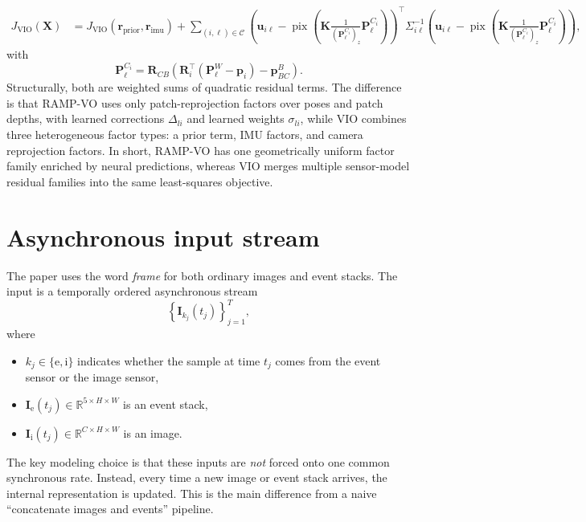 \documentclass[11pt]{article}
\newcommand{\R}{\mathbb{R}}
\newcommand{\T}{^{\top}}
\begin{document}
\begin{align}
J_{\mathrm{VIO}}(\mathbf{X}) &=
J_{\mathrm{VIO}}(\mathbf{r}_{\mathrm{prior}},\mathbf{r}_{\mathrm{imu}})
+
\sum_{(i,\ell)\in \mathcal{C}}
\left(
\mathbf{u}_{i\ell} -
\operatorname{pix}\!\left(
\mathbf{K}\frac{1}{(\mathbf{P}_{\ell}^{C_i})_z}\mathbf{P}_{\ell}^{C_i}
\right)
\right)\T
\Sigma_{i\ell}^{-1}
\left(
\mathbf{u}_{i\ell} -
\operatorname{pix}\!\left(
\mathbf{K}\frac{1}{(\mathbf{P}_{\ell}^{C_i})_z}\mathbf{P}_{\ell}^{C_i}
\right)
\right),
\end{align}
with 
\[
\mathbf{P}_{\ell}^{C_i}
=
\mathbf{R}_{CB}\!\left(\mathbf{R}_i\T(\mathbf{P}_\ell^W-\mathbf{p}_i)-\mathbf{p}_{BC}^B\right).
\]
Structurally, both are weighted sums of quadratic residual terms. The difference is that RAMP-VO uses only patch-reprojection factors over poses and patch depths, with learned corrections \(\Delta_{li}\) and learned weights \(\sigma_{li}\), while VIO combines three heterogeneous factor types: a prior term, IMU factors, and camera reprojection factors. In short, RAMP-VO has one geometrically uniform factor family enriched by neural predictions, whereas VIO merges multiple sensor-model residual families into the same least-squares objective.


\section{Asynchronous input stream}

The paper uses the word \emph{frame} for both ordinary images and event stacks.
The input is a temporally ordered asynchronous stream
\begin{equation}
\left\{ \mathbf{I}_{k_j}(t_j) \right\}_{j=1}^{T},
\end{equation}
where
\begin{itemize}
    \item \(k_j \in \{\mathrm{e},\mathrm{i}\}\) indicates whether the sample at time \(t_j\) comes from the event sensor or the image sensor,
    \item \(\mathbf{I}_{\mathrm{e}}(t_j) \in \R^{5\times H\times W}\) is an event stack,
    \item \(\mathbf{I}_{\mathrm{i}}(t_j) \in \R^{C\times H\times W}\) is an image.
\end{itemize}
The key modeling choice is that these inputs are \emph{not} forced onto one common synchronous rate.
Instead, every time a new image or event stack arrives, the internal representation is updated.
This is the main difference from a naive ``concatenate images and events'' pipeline.
\end{document}
